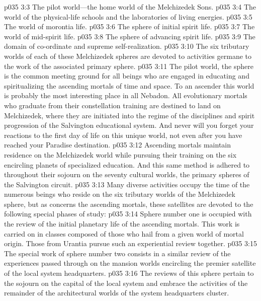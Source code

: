 \pc \vs p035 3:3 \bibnobreakspace The pilot world---the home world of the Melchizedek Sons.
\vs p035 3:4 \bibnobreakspace The world of the physical\hyp{}life schools and the laboratories of living energies.
\vs p035 3:5 \bibnobreakspace The world of morontia life.
\vs p035 3:6 \bibnobreakspace The sphere of initial spirit life.
\vs p035 3:7 \bibnobreakspace The world of mid\hyp{}spirit life.
\vs p035 3:8 \bibnobreakspace The sphere of advancing spirit life.
\vs p035 3:9 \bibnobreakspace The domain of co\hyp{}ordinate and supreme self\hyp{}realization.
\pc \vs p035 3:10 The six tributary worlds of each of these Melchizedek spheres are devoted to activities germane to the work of the associated primary sphere.
\pc \vs p035 3:11 The pilot world, the sphere  is the common meeting ground for all beings who are engaged in educating and spiritualizing the ascending mortals of time and space. To an ascender this world is probably the most interesting place in all Nebadon. All evolutionary mortals who graduate from their constellation training are destined to land on Melchizedek, where they are initiated into the regime of the disciplines and spirit progression of the Salvington educational system. And never will you forget your reactions to the first day of life on this unique world, not even after you have reached your Paradise destination.
\vs p035 3:12 Ascending mortals maintain residence on the Melchizedek world while pursuing their training on the six encircling planets of specialized education. And this same method is adhered to throughout their sojourn on the seventy cultural worlds, the primary spheres of the Salvington circuit.
\pc \vs p035 3:13 Many diverse activities occupy the time of the numerous beings who reside on the six tributary worlds of the Melchizedek sphere, but as concerns the ascending mortals, these satellites are devoted to the following special phases of study:
\pc \vs p035 3:14 \bibnobreakspace Sphere number one is occupied with the review of the initial planetary life of the ascending mortals. This work is carried on in classes composed of those who hail from a given world of mortal origin. Those from Urantia pursue such an experiential review together.
\pc \vs p035 3:15 \bibnobreakspace The special work of sphere number two consists in a similar review of the experiences passed through on the mansion worlds encircling the premier satellite of the local system headquarters.
\pc \vs p035 3:16 \bibnobreakspace The reviews of this sphere pertain to the sojourn on the capital of the local system and embrace the activities of the remainder of the architectural worlds of the system headquarters cluster.

